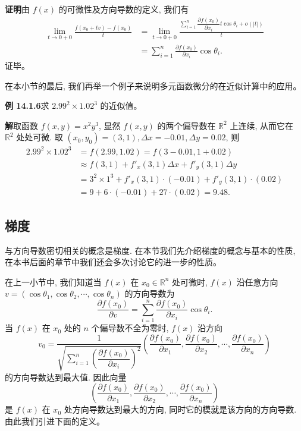 \documentclass[UTF8,12pt,a4paper,fontset=fandol]{ctexart}
\begin{document}
\noindent\textbf{证明}\quad 由 $f(x)$ 的可微性及方向导数的定义, 我们有
\[
\begin{aligned}
  \lim_{t\to0+0}\frac{f(x_0+tv)-f(x_0)}{t}
  &=\lim_{t\to0+0}
  \frac{\sum\limits_{i=1}^n\dfrac{\partial f(x_0)}{\partial x_i}t\cos\theta_i+o(|t|)}{t}\\
  &=\sum_{i=1}^n\frac{\partial f(x_0)}{\partial x_i}\cos\theta_i.
\end{aligned}
\]
证毕。

在本小节的最后, 我们再举一个例子来说明多元函数微分的在近似计算中的应用。

\noindent\textbf{例 14.1.6}\quad 求 $2.99^2\times1.02^3$ 的近似值。

\noindent\textbf{解}\quad 取函数 $f(x,y)=x^2y^3$, 显然 $f(x,y)$ 的两个偏导数在 $\mathbb R^2$ 上连续, 从而它在 $\mathbb R^2$ 处处可微. 取 $(x_0,y_0)=(3,1), \Delta x=-0.01, \Delta y=0.02$, 则
\[
\begin{aligned}
  2.99^2\times1.02^3
  &=f(2.99,1.02)=f(3-0.01,1+0.02)\\
  &\approx f(3,1)+f'_x(3,1)\Delta x+f'_y(3,1)\Delta y\\
  &=3^2\times1^3+f'_x(3,1)\cdot(-0.01)+f'_y(3,1)\cdot(0.02)\\
  &=9+6\cdot(-0.01)+27\cdot(0.02)=9.48.
\end{aligned}
\]

\subsection{梯度}

与方向导数密切相关的概念是梯度. 在本节我们先介绍梯度的概念与基本的性质, 在本书后面的章节中我们还会多次讨论它的进一步的性质。

在上一小节中, 我们知道当 $f(x)$ 在 $x_0\in\mathbb R^n$ 处可微时, $f(x)$ 沿任意方向 $v=(\cos\theta_1,\cos\theta_2,\cdots,\cos\theta_n)$ 的方向导数为
\[
  \frac{\partial f(x_0)}{\partial v}=
  \sum_{i=1}^n\frac{\partial f(x_0)}{\partial x_i}\cos\theta_i.
\]
当 $f(x)$ 在 $x_0$ 处的 $n$ 个偏导数不全为零时, $f(x)$ 沿方向
\[
  v_0=
  \frac1{\sqrt{\sum\limits_{i=1}^n\left(\dfrac{\partial f(x_0)}{\partial x_i}\right)^2}}
  \left(\frac{\partial f(x_0)}{\partial x_1},\frac{\partial f(x_0)}{\partial x_2},\cdots,\frac{\partial f(x_0)}{\partial x_n}\right)
\]
的方向导数达到最大值. 因此向量
\[
  \left(\frac{\partial f(x_0)}{\partial x_1},\frac{\partial f(x_0)}{\partial x_2},\cdots,\frac{\partial f(x_0)}{\partial x_n}\right)
\]
是 $f(x)$ 在 $x_0$ 处方向导数达到最大的方向, 同时它的模就是该方向的方向导数. 由此我们引进下面的定义。
\end{document}
